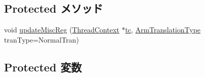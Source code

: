 \subsection*{Protected メソッド}
\begin{DoxyCompactItemize}
\item 
void \hyperlink{classArmISA_1_1TLB_a7eb66b75612ed7e8b075cd89dfd2b157}{updateMiscReg} (\hyperlink{classThreadContext}{ThreadContext} $\ast$\hyperlink{namespaceArmISA_a5aff829af55e65b802d83dfcef4e9dd0}{tc}, \hyperlink{classArmISA_1_1TLB_ad6f5d480df151d5bddeefc6271793f08}{ArmTranslationType} tranType=NormalTran)
\end{DoxyCompactItemize}
\subsection*{Protected 変数}

